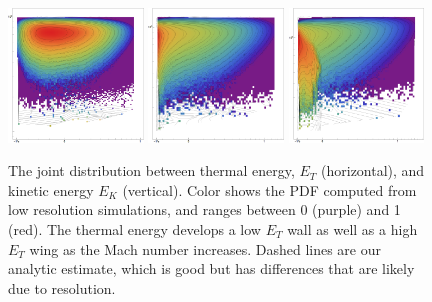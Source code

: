 
\begin{figure} \begin{center}
\includegraphics[width=0.32\textwidth]{figs/mach5_contours_comparison_V_MCMC.png}
\includegraphics[width=0.32\textwidth]{figs/mach10_contours_comparison_V_MCMC.png}
\includegraphics[width=0.32\textwidth]{figs/mach20_contours_comparison_V_MCMC.png}
\caption[ ]{The joint distribution between thermal energy, $E_T$ (horizontal), and kinetic
energy $E_K$ (vertical). Color shows the PDF computed from low resolution simulations, and ranges between 0 (purple) and 1
(red).  The thermal energy develops a low $E_T$ wall as well as a high $E_T$
wing as the Mach number increases.  Dashed lines are our analytic estimate,
which is good but has differences that are likely due to resolution. }
\label{fig.energy} \end{center} \end{figure}

